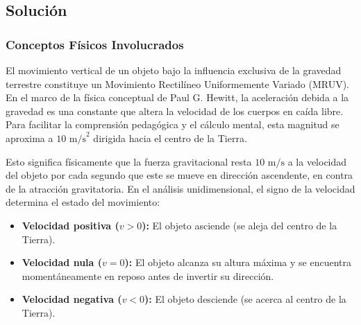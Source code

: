 \documentclass[12pt, a4paper]{article}
\begin{document}
\begin{center}
\end{center}

\subsection*{Solución}

\subsubsection*{Conceptos Físicos Involucrados}

El movimiento vertical de un objeto bajo la influencia exclusiva de la gravedad terrestre constituye un Movimiento Rectilíneo Uniformemente Variado (MRUV). En el marco de la física conceptual de Paul G. Hewitt, la aceleración debida a la gravedad es una constante que altera la velocidad de los cuerpos en caída libre. Para facilitar la comprensión pedagógica y el cálculo mental, esta magnitud se aproxima a $10 \text{ m/s}^2$ dirigida hacia el centro de la Tierra.

Esto significa físicamente que la fuerza gravitacional resta $10 \text{ m/s}$ a la velocidad del objeto por cada segundo que este se mueve en dirección ascendente, en contra de la atracción gravitatoria. En el análisis unidimensional, el signo de la velocidad determina el estado del movimiento:
\begin{itemize}
    \item \textbf{Velocidad positiva ($v > 0$):} El objeto asciende (se aleja del centro de la Tierra).
    \item \textbf{Velocidad nula ($v = 0$):} El objeto alcanza su altura máxima y se encuentra momentáneamente en reposo antes de invertir su dirección.
    \item \textbf{Velocidad negativa ($v < 0$):} El objeto desciende (se acerca al centro de la Tierra).
\end{itemize}
\end{document}
